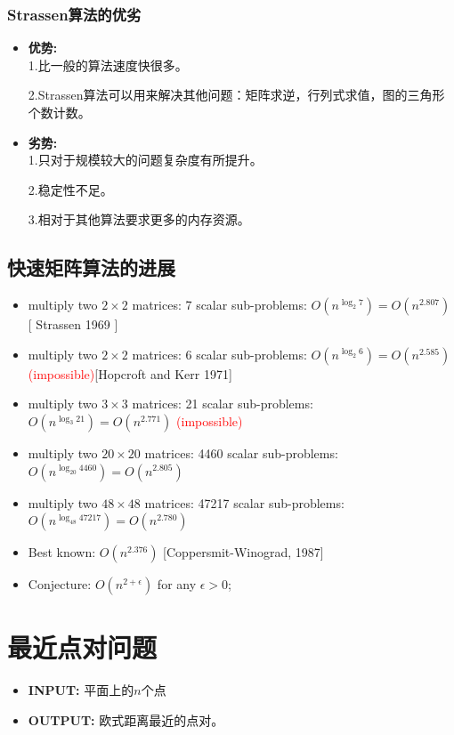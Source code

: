 \subsubsection{Strassen算法的优劣}	
\begin{itemize}
\item {\bf 优势:}\\
	1.比一般的算法速度快很多。

	2.Strassen算法可以用来解决其他问题：矩阵求逆，行列式求值，图的三角形个数计数。
\item {\bf 劣势:}\\
	1.只对于规模较大的问题复杂度有所提升。
	
	2.稳定性不足。
	
	3.相对于其他算法要求更多的内存资源。
\end{itemize}

\subsection{快速矩阵算法的进展}
\begin{itemize}
 \item multiply two $2 \times 2$ matrices: 7 scalar sub-problems: $O(n^{\log_2 7}) = O(n^{2.807})$ [ Strassen 1969 ]
 \item multiply two $2 \times 2$ matrices: 6 scalar sub-problems: $O(n^{\log_2 6})=O(n^{2.585})$ \textcolor{red}{(impossible)}[Hopcroft and Kerr 1971] 
\item multiply two $3 \times 3$ matrices: 21 scalar sub-problems: $O(n^{\log_3 21})=O(n^{2.771})$ \textcolor{red}{(impossible)}
\item multiply two $20 \times 20$ matrices: 4460 scalar sub-problems: $O(n^{\log_{20} 4460})=O(n^{2.805} )$ 
\item multiply two $48 \times 48$ matrices: 47217 scalar sub-problems: $O(n^{\log_{48} 47217 })=O(n^{2.780})$ 
\item Best known: $O(n^{2.376})$ [Coppersmit-Winograd, 1987]
\item Conjecture: $O( n^{2+\epsilon} )$ for any $\epsilon > 0$; 
\end{itemize}

\section{最近点对问题}
\begin{itemize}
\item
 {\bf INPUT: } 平面上的$n$个点  
\item
 {\bf OUTPUT: } 欧式距离最近的点对。
\end{itemize}


